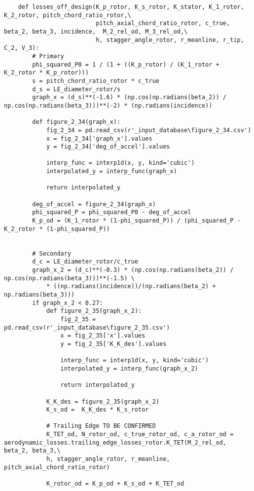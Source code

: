 \begin{verbatim}
    def losses_off_design(K_p_rotor, K_s_rotor, K_stator, K_1_rotor, K_2_rotor, pitch_chord_ratio_rotor,\
                          pitch_axial_chord_ratio_rotor, c_true, beta_2, beta_3, incidence,  M_2_rel_od, M_3_rel_od,\
                          h, stagger_angle_rotor, r_meanline, r_tip, C_2, V_3):
        # Primary
        phi_squared_P0 = 1 / (1 + ((K_p_rotor) / (K_1_rotor + K_2_rotor * K_p_rotor)))
        s = pitch_chord_ratio_rotor * c_true
        d_s = LE_diameter_rotor/s 
        graph_x = (d_s)**(-1.6) * (np.cos(np.radians(beta_2)) / np.cos(np.radians(beta_3)))**(-2) * (np.radians(incidence))

        def figure_2_34(graph_x):
            fig_2_34 = pd.read_csv(r'_input_database\figure_2_34.csv')
            x = fig_2_34['graph_x'].values
            y = fig_2_34['deg_of_accel'].values

            interp_func = interp1d(x, y, kind='cubic')
            interpolated_y = interp_func(graph_x)

            return interpolated_y
        
        deg_of_accel = figure_2_34(graph_x)
        phi_squared_P = phi_squared_P0 - deg_of_accel
        K_p_od = (K_1_rotor * (1-phi_squared_P)) / (phi_squared_P - K_2_rotor * (1-phi_squared_P))


        # Secondary
        d_c = LE_diameter_rotor/c_true
        graph_x_2 = (d_c)**(-0.3) * (np.cos(np.radians(beta_2)) / np.cos(np.radians(beta_3)))**(-1.5) \
            * ((np.radians(incidence))/(np.radians(beta_2) + np.radians(beta_3)))
        if graph_x_2 < 0.27:
            def figure_2_35(graph_x_2):
                fig_2_35 = pd.read_csv(r'_input_database\figure_2_35.csv')
                x = fig_2_35['x'].values
                y = fig_2_35['K_K_des'].values

                interp_func = interp1d(x, y, kind='cubic')
                interpolated_y = interp_func(graph_x_2)

                return interpolated_y
            
            K_K_des = figure_2_35(graph_x_2)
            K_s_od =  K_K_des * K_s_rotor

            # Trailing Edge TO BE CONFIRMED
            K_TET_od, N_rotor_od, c_true_rotor_od, c_a_rotor_od = aerodynamic_losses.trailing_edge_losses_rotor.K_TET(M_2_rel_od, beta_2, beta_3,\
            h, stagger_angle_rotor, r_meanline, pitch_axial_chord_ratio_rotor)

            K_rotor_od = K_p_od + K_s_od + K_TET_od


\end{verbatim}
